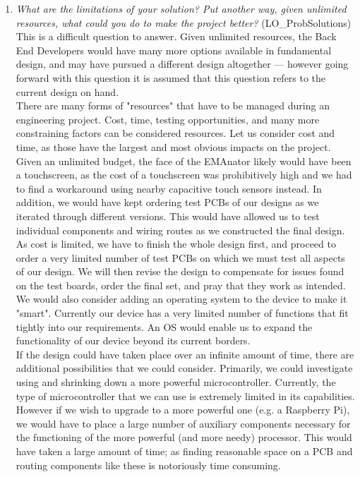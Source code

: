 \documentclass[12pt, titlepage]{article}
\begin{document}
\begin{enumerate}
  \item \textit{What are the limitations of your solution?  Put another way, given
  unlimited resources, what could you do to make the project better? }(LO\_ProbSolutions)\\

This is a difficult question to answer. Given unlimited resources, the Back End Developers would have many more options available in fundamental design, and may have pursued a different design altogether --- however going forward with this question it is assumed that this question refers to the current design on hand.\\

There are many forms of "resources" that have to be managed during an engineering project. Cost, time, testing opportunities, and many more constraining factors can be considered resources. Let us consider cost and time, as those have the largest and most obvious impacts on the project.\\

Given an unlimited budget, the face of the EMAnator likely would have been a touchscreen, as the cost of a touchscreen was prohibitively high and we had to find a workaround using nearby capacitive touch sensors instead. In addition, we would have kept ordering test PCBs of our designs as we iterated through different versions. This would have allowed us to test individual components and wiring routes as we constructed the final design. As cost is limited, we have to finish the whole design first, and proceed to order a very limited number of test PCBs on which we must test all aspects of our design. We will then revise the design to compensate for issues found on the test boards, order the final set, and pray that they work as intended. We would also consider adding an operating system to the device to make it "smart". Currently our device has a very limited number of functions that fit tightly into our requirements. An OS would enable us to expand the functionality of our device beyond its current borders.\\

If the design could have taken place over an infinite amount of time, there are additional possibilities that we could consider. Primarily, we could investigate using and shrinking down a more powerful microcontroller. Currently, the type of microcontroller that we can use is extremely limited in its capabilities. However if we wish to upgrade to a more powerful one (e.g. a Raspberry Pi), we would have to place a large number of auxiliary components necessary for the functioning of the more powerful (and more needy) processor. This would have taken a large amount of time; as finding reasonable space on a PCB and routing components like these is notoriously time consuming.\\


\end{enumerate}
\end{document}
